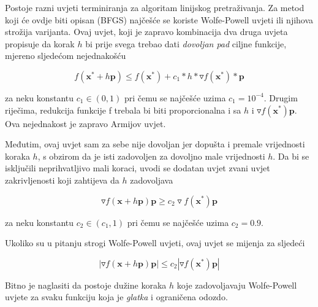 \documentclass[bosnian,12pt,a4paper]{report}
\begin{document}
	\vspace{0.5cm}
	Postoje razni uvjeti terminiranja za algoritam linijskog pretraživanja. Za metod koji će ovdje biti opisan (BFGS) najčešće se koriste Wolfe-Powell uvjeti ili njihova strožija  varijanta. Ovaj uvjet, koji je zapravo kombinacija dva druga uvjeta propisuje da korak $h$ bi prije svega trebao dati \textit{dovoljan pad} ciljne funkcije, mjereno sljedećom nejednakošću
	
	$$f(\textbf{x}^* + h\textbf{p}) \leq f(\textbf{x}^*) + c_1 * h * \triangledown f(\textbf{x}^*) * \textbf{p}$$ 
	
	\vspace{0.5cm}
	za neku konstantu $c_1 \in (0,1)$ pri čemu se najčešće uzima $c_1 = 10^{-4}$. Drugim riječima, redukcija funkcije f trebala bi biti proporcionalna i sa $h$ i $\triangledown f(\textbf{x}^*)\textbf{p}$. Ova nejednakost je zapravo Armijov uvjet. 
	
	\vspace{0.5cm}
	Međutim, ovaj uvjet sam za sebe nije dovoljan jer dopušta i premale vrijednosti koraka $h$, s obzirom da je isti zadovoljen za dovoljno male vrijednosti $h$. Da bi se isključili neprihvatljivo mali koraci, uvodi se dodatan uvjet zvani uvjet zakrivljenosti koji zahtijeva da $h$ zadovoljava
	
	$$\triangledown f(\textbf{x} + h\textbf{p})\textbf{p} \geq  c_2 \triangledown f(\textbf{x}^*)\textbf{p}$$
	
	\vspace{0.5cm}
	za neku konstantu $c_2 \in (c_1, 1)$ pri čemu se najčešće uzima $c_2 = 0.9$.
	
	\vspace{0.5cm}
	Ukoliko su u pitanju strogi Wolfe-Powell uvjeti, ovaj uvjet se mijenja za sljedeći

	$$|\triangledown f(\textbf{x} + h\textbf{p})\textbf{p}| \leq  c_2 |\triangledown f(\textbf{x}^*)\textbf{p}|$$
	
	\vspace{0.5cm}
	Bitno je naglasiti da postoje dužine koraka $h$ koje zadovoljavaju Wolfe-Powell uvjete za svaku funkciju koja je \textit{glatka} i ograničena odozdo.
\end{document}
